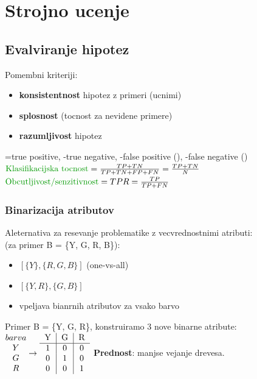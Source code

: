\section{Strojno ucenje}

\subsection{Evalviranje hipotez}
Pomembni kriteriji:
\begin{itemize}
    \item \textbf{konsistentnost} hipotez z primeri (ucnimi)
    \item \textbf{splosnost} (tocnost za nevidene primere)
    \item \textbf{razumljivost} hipotez
\end{itemize}
=true positive, -true negative, -false positive (), -false negative () \\
$\text{\green{Klasifikacijska tocnost}}=\frac{TP+TN}{TP+TN+FP+FN}=\frac{TP+TN}{N}$\\
$\text{\green{Obcutljivost/senzitivnost}}=TPR=\frac{TP}{TP+FN}$

\subsubsection{Binarizacija atributov}
Aleternativa za resevanje problematike z vecvrednostnimi atributi:\\
 (za primer B = \{Y, G, R, B\}):
\begin{itemize}[leftmargin=*,topsep=0pt,noitemsep]
    \item $\left[\{Y \}, \{R, G, B \} \right]$ (one-vs-all)
    \item $\left[\{Y, R\}, \{G, B\}\right]$ 
    \item vpeljava bianrnih atributov za vsako barvo
\end{itemize}
Primer B = \{Y, G, R\}, konstruiramo 3 nove binarne atribute:\\
$ \begin{matrix} barva \\ Y \\ G \\ R \end{matrix} \rightarrow \begin{tabular}{c|c|c} Y & G & R \\ \hline 1 & 0 & 0 \\ 0 & 1 & 0 \\ 0 & 0 & 1\end{tabular}$
\textbf{Prednost}: manjse vejanje drevesa.

